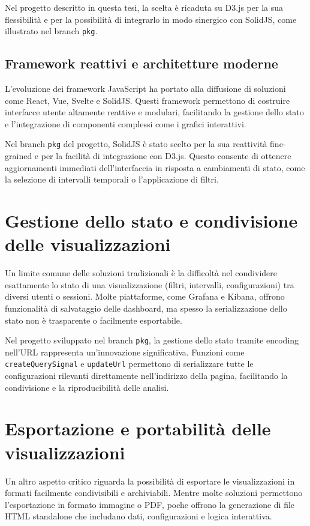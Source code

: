 Nel progetto descritto in questa tesi, la scelta è ricaduta su D3.js per la sua flessibilità e per la possibilità di integrarlo in modo sinergico con SolidJS, come illustrato nel branch \texttt{pkg}.

\subsection{Framework reattivi e architetture moderne}

L'evoluzione dei framework JavaScript ha portato alla diffusione di soluzioni come React, Vue, Svelte e SolidJS. Questi framework permettono di costruire interfacce utente altamente reattive e modulari, facilitando la gestione dello stato e l'integrazione di componenti complessi come i grafici interattivi.

Nel branch \texttt{pkg} del progetto, SolidJS è stato scelto per la sua reattività fine-grained e per la facilità di integrazione con D3.js. Questo consente di ottenere aggiornamenti immediati dell'interfaccia in risposta a cambiamenti di stato, come la selezione di intervalli temporali o l'applicazione di filtri.

\section{Gestione dello stato e condivisione delle visualizzazioni}

Un limite comune delle soluzioni tradizionali è la difficoltà nel condividere esattamente lo stato di una visualizzazione (filtri, intervalli, configurazioni) tra diversi utenti o sessioni. Molte piattaforme, come Grafana e Kibana, offrono funzionalità di salvataggio delle dashboard, ma spesso la serializzazione dello stato non è trasparente o facilmente esportabile.

Nel progetto sviluppato nel branch \texttt{pkg}, la gestione dello stato tramite encoding nell'URL rappresenta un'innovazione significativa. Funzioni come \texttt{createQuerySignal} e \texttt{updateUrl} permettono di serializzare tutte le configurazioni rilevanti direttamente nell'indirizzo della pagina, facilitando la condivisione e la riproducibilità delle analisi.

\section{Esportazione e portabilità delle visualizzazioni}

Un altro aspetto critico riguarda la possibilità di esportare le visualizzazioni in formati facilmente condivisibili e archiviabili. Mentre molte soluzioni permettono l'esportazione in formato immagine o PDF, poche offrono la generazione di file HTML standalone che includano dati, configurazioni e logica interattiva.

